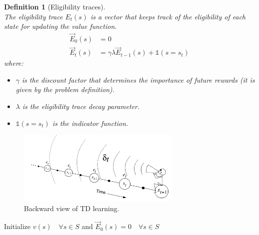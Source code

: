 \documentclass[11pt]{book} %
\newtheorem{definition}{Definition}[section]
\begin{document}
\begin{definition}[Eligibility traces]\ \\
    The eligibility trace $E_t(s)$ is a vector that keeps track of the eligibility of each state for updating the value function.
    \begin{align*}
        \vec{E}_0(s) &= 0 \\
        \vec{E}_t(s) &= \gamma \lambda \vec{E}_{t-1}(s) + \mathds{1}(s = s_t)
    \end{align*}
    where:
    \begin{itemize}
        \item $\gamma$ is the discount factor that determines the importance of future rewards (it is given by the problem definition).
        \item $\lambda$ is the eligibility trace decay parameter.
        \item $\mathds{1}(s = s_t)$ is the indicator function.
    \end{itemize}
\end{definition}

\begin{figure}
    \centering
    \includegraphics[width=0.7\textwidth]{./Figs/Backword_TD.png}
    \caption{Backward view of TD learning.}
    \label{fig:eligibility_traces}
\end{figure}

\begin{algorithm}[H]
    \SetNoFillComment
    \SetAlgoLined
    Initialize $v(s) \quad \forall s \in S$ and $\vec{E}_0(s) = 0 \quad \forall s \in S$ \\
    \caption{Temporal difference learning with eligibility traces (TD($\lambda$))} \label{Temporal difference learning}
\end{algorithm}
\end{document}
